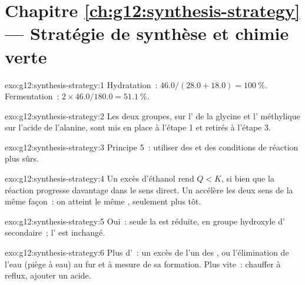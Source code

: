 \section*{Chapitre \ref{ch:g12:synthesis-strategy} --- Stratégie de synthèse et chimie verte}

\begin{solution}{exo:g12:synthesis-strategy:1}
Hydratation~: $46.0/(28.0 + 18.0) = \qty{100}{\percent}$. Fermentation~:
$2 \times 46.0/180.0 = \qty{51.1}{\percent}$.
\end{solution}

\begin{solution}{exo:g12:synthesis-strategy:2}
Les deux groupes,  sur l' de la glycine et l' méthylique
sur l'acide
de l'alanine, sont mis en place à l'étape 1 et retirés à l'étape 3.
\end{solution}

\begin{solution}{exo:g12:synthesis-strategy:3}
Principe 5~: utiliser des  et des conditions de réaction plus
sûrs.
\end{solution}

\begin{solution}{exo:g12:synthesis-strategy:4}
Un excès d'éthanol rend $Q < K$, si bien que la réaction progresse
davantage dans le sens direct. Un  accélère les deux sens de
la même façon~: on atteint le même , seulement plus tôt.
\end{solution}

\begin{solution}{exo:g12:synthesis-strategy:5}
Oui~: seule la  est réduite, en groupe hydroxyle d'
secondaire~; l' est inchangé.
\end{solution}

\begin{solution}{exo:g12:synthesis-strategy:6}
Plus d'~: un excès de l'un des , ou l'élimination de l'eau
(piège à eau) au fur et à mesure de sa formation. Plus vite~: chauffer à
reflux, ajouter un  acide.
\end{solution}

